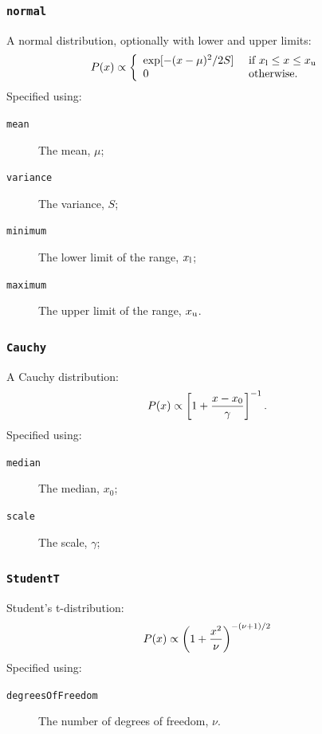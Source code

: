 \subsubsection{{\tt normal}}

A normal distribution, optionally with lower and upper limits:
\begin{equation}
P(x) \propto \left\{ \begin{array}{ll} \exp[-(x-\mu)^2/2S] & \hbox{ if } x_{\rm l} \leq x \leq x_{\rm u} \\ 0 & \hbox{ otherwise.}  \end{array} \right.
\end{equation}
Specified using:
\begin{description}
\item[{\tt mean}] The mean, $\mu$;
\item[{\tt variance}] The variance, $S$;
\item[{\tt minimum}] The lower limit of the range, $x_{\rm l}$;
\item[{\tt maximum}] The upper limit of the range, $x_{\rm u}$.
\end{description}

\subsubsection{{\tt Cauchy}}

A Cauchy distribution:
\begin{equation}
P(x) \propto \left[1+{x-x_0\over\gamma}\right]^{-1}.
\end{equation}
Specified using:
\begin{description}
\item[{\tt median}] The median, $x_0$;
\item[{\tt scale}] The scale, $\gamma$;
\end{description}

\subsubsection{{\tt StudentT}}

Student's t-distribution:
\begin{equation}
P(x) \propto \left(1 + {x^2\over \nu}\right)^{-(\nu+1)/2}
\end{equation}
Specified using:
\begin{description}
\item[{\tt degreesOfFreedom}] The number of degrees of freedom, $\nu$.
\end{description}
